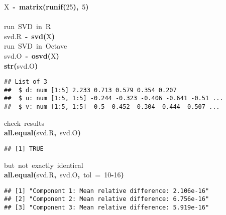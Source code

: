 \documentclass[english,10pt,a4paper]{article}\usepackage{graphicx, color}
\makeatletter
\newcommand{\hlnumber}[1]{\textcolor[rgb]{0,0,0}{#1}}%
\newcommand{\hlfunctioncall}[1]{\textcolor[rgb]{0.501960784313725,0,0.329411764705882}{\textbf{#1}}}%
\newcommand{\hlkeyword}[1]{\textcolor[rgb]{0,0,0}{\textbf{#1}}}%
\newcommand{\hlargument}[1]{\textcolor[rgb]{0.690196078431373,0.250980392156863,0.0196078431372549}{#1}}%
\newcommand{\hlcomment}[1]{\textcolor[rgb]{0.180392156862745,0.6,0.341176470588235}{#1}}%
\newcommand{\hlassignement}[1]{\textcolor[rgb]{0,0,0}{\textbf{#1}}}%
\newcommand{\hlsymbol}[1]{\textcolor[rgb]{0,0,0}{#1}}%
\newcommand{\hlstd}[1]{\textcolor[rgb]{0,0,0}{#1}}%
\newenvironment{kframe}{%
 \def\FrameCommand##1{\hskip\@totalleftmargin \hskip-\fboxsep
 \colorbox{shadecolor}{##1}\hskip-\fboxsep
     \hskip-\linewidth \hskip-\@totalleftmargin \hskip\columnwidth}%
 \MakeFramed {\advance\hsize-\width
   \@totalleftmargin\z@ \linewidth\hsize
   \@setminipage}}%
 {\par\unskip\endMakeFramed}
\newenvironment{knitrout}{}{} %
\makeatother
\begin{document}
\begin{knitrout}
\begin{kframe}
\begin{flushleft}
\hlstd{}\hlsymbol{X}{\ }\hlassignement{\usebox{\hlnormalsizeboxlessthan}-}{\ }\hlfunctioncall{matrix}\hlkeyword{(}\hlfunctioncall{runif}\hlkeyword{(}\hlnumber{25}\hlkeyword{)}\hlkeyword{,}{\ }\hlnumber{5}\hlkeyword{)}\hspace*{\fill}\\
\hlstd{}\hspace*{\fill}\\
\hlstd{}\hlcomment{\usebox{\hlnormalsizeboxhash}{\ }run{\ }SVD{\ }in{\ }R}\hspace*{\fill}\\
\hlstd{}\hlsymbol{svd.R}{\ }\hlassignement{\usebox{\hlnormalsizeboxlessthan}-}{\ }\hlfunctioncall{svd}\hlkeyword{(}\hlsymbol{X}\hlkeyword{)}\hspace*{\fill}\\
\hlstd{}\hlcomment{\usebox{\hlnormalsizeboxhash}{\ }run{\ }SVD{\ }in{\ }Octave}\hspace*{\fill}\\
\hlstd{}\hlsymbol{svd.O}{\ }\hlassignement{\usebox{\hlnormalsizeboxlessthan}-}{\ }\hlfunctioncall{o\usebox{\hlnormalsizeboxunderscore}svd}\hlkeyword{(}\hlsymbol{X}\hlkeyword{)}\hspace*{\fill}\\
\hlstd{}\hlfunctioncall{str}\hlkeyword{(}\hlsymbol{svd.O}\hlkeyword{)}\mbox{}
\normalfont
\end{flushleft}
\begin{verbatim}
## List of 3
##  $ d: num [1:5] 2.233 0.713 0.579 0.354 0.207
##  $ u: num [1:5, 1:5] -0.244 -0.323 -0.406 -0.641 -0.51 ...
##  $ v: num [1:5, 1:5] -0.5 -0.452 -0.304 -0.444 -0.507 ...
\end{verbatim}
\begin{flushleft}
\ttfamily\noindent
\hlcomment{\usebox{\hlnormalsizeboxhash}{\ }check{\ }results}\hspace*{\fill}\\
\hlstd{}\hlfunctioncall{all.equal}\hlkeyword{(}\hlsymbol{svd.R}\hlkeyword{,}{\ }\hlsymbol{svd.O}\hlkeyword{)}\mbox{}
\normalfont
\end{flushleft}
\begin{verbatim}
## [1] TRUE
\end{verbatim}
\begin{flushleft}
\ttfamily\noindent
\hlcomment{\usebox{\hlnormalsizeboxhash}{\ }but{\ }not{\ }exactly{\ }identical}\hspace*{\fill}\\
\hlstd{}\hlfunctioncall{all.equal}\hlkeyword{(}\hlsymbol{svd.R}\hlkeyword{,}{\ }\hlsymbol{svd.O}\hlkeyword{,}{\ }\hlargument{tol}{\ }\hlargument{=}{\ }\hlnumber{10}\hlkeyword{\usebox{\hlnormalsizeboxhat}}\hlkeyword{-}\hlnumber{16}\hlkeyword{)}\mbox{}
\normalfont
\end{flushleft}
\begin{verbatim}
## [1] "Component 1: Mean relative difference: 2.106e-16"
## [2] "Component 2: Mean relative difference: 6.756e-16"
## [3] "Component 3: Mean relative difference: 5.919e-16"
\end{verbatim}
\end{kframe}
\end{knitrout}
\end{document}
